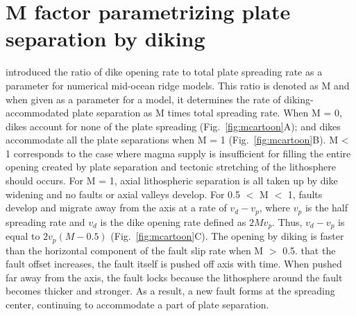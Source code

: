 \documentclass[letterpaper,12pt,notitle]{memphisthesis}                     %
\begin{document}
\section{M factor parametrizing plate separation by diking}
\citet{Buck2005} introduced the ratio of dike opening rate to total plate spreading rate as a parameter for numerical mid-ocean ridge models. This ratio is denoted as M and when given as a parameter for a model, it determines the rate of diking-accommodated plate separation as M times total spreading rate. When M = 0, dikes account for none of the plate spreading (Fig.~\ref{fig:mcartoon}A); and dikes accommodate all the plate separations when M = 1 (Fig.~\ref{fig:mcartoon}B). M < 1 corresponds to the case where magma supply is insufficient for filling the entire opening created by plate separation and tectonic stretching of the lithosphere should occurs. For M = 1, axial lithospheric separation is all taken up by dike widening and no faults or axial valleys develop. For 0.5 $<$ M $<$ 1, faults develop and migrate away from the axis at a rate of $v_d-v_p$, where $v_{p}$ is the half spreading rate and $v_{d}$ is the dike opening rate defined as $2Mv_{p}$. Thus, $v_{d}-v_{p}$ is equal to $2 v_p (M - 0.5)$ (Fig.~\ref{fig:mcartoon}C). 
The opening by diking is faster than the horizontal component of the fault slip rate when M $>$ 0.5. that the fault offset increases, the fault itself is pushed off axis with time. When pushed far away from the axis, the fault locks because the lithosphere around the fault becomes thicker and stronger. As a result, a new fault forms at the spreading center, continuing to accommodate a part of plate separation. 
\end{document}
